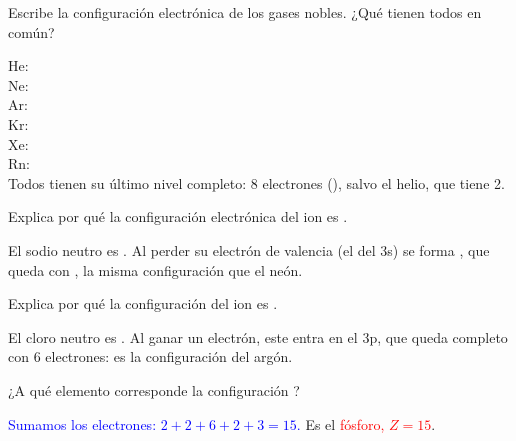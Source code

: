 \begin{exercise}
    Escribe la configuración electrónica de los gases nobles. ¿Qué tienen todos en común?
    \begin{solu}
        He: \\
        Ne: \\
        Ar: \\
        Kr: \\
        Xe: \\
        Rn: \\
        Todos tienen su último nivel completo: 8 electrones (), salvo el helio, que tiene 2.
    \end{solu}
\end{exercise}

\begin{exercise}
    Explica por qué la configuración electrónica del ion  es .
    \begin{solu}
        El sodio neutro es . Al perder su electrón de valencia (el del 3s) se forma , que queda con , la misma configuración que el neón.
    \end{solu}
\end{exercise}

\begin{exercise}
    Explica por qué la configuración del ion  es .
    \begin{solu}
        El cloro neutro es . Al ganar un electrón, este entra en el 3p, que queda completo con 6 electrones: es la configuración del argón.
    \end{solu}
\end{exercise}

\begin{exercise}
    ¿A qué elemento corresponde la configuración ?
    \begin{solu}
        \textcolor{blue}{Sumamos los electrones: \(2 + 2 + 6 + 2 + 3 = 15\).} Es el \textcolor{red}{fósforo, \(Z = 15\)}.
    \end{solu}
\end{exercise}

